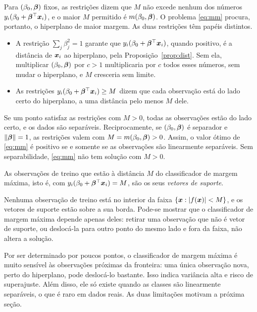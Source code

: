 \documentclass[11pt,a4paper]{article}
\begin{document}
Para $(\beta_0,\bm{\beta})$ fixos, as restrições dizem que $M$ não excede nenhum dos
números $y_i(\beta_0+\bm{\beta}^\top\bm{x}_i)$, e o maior $M$ permitido é
$m(\beta_0,\bm{\beta})$. O problema \eqref{eq:mm} procura, portanto, o hiperplano de maior
margem. As duas restrições têm papéis distintos.
\begin{itemize}[leftmargin=1.4cm]
  \item A restrição $\sum_j\beta_j^2=1$ garante que $y_i(\beta_0+\bm{\beta}^\top\bm{x}_i)$,
        quando positivo, é a distância de $\bm{x}_i$ ao hiperplano, pela
        Proposição~\ref{prop:dist}. Sem ela, multiplicar
        $(\beta_0,\bm{\beta})$ por $c>1$ multiplicaria por $c$ todos esses números, sem
        mudar o hiperplano, e $M$ cresceria sem limite.
  \item As restrições $y_i(\beta_0+\bm{\beta}^\top\bm{x}_i)\ge M$ dizem que cada observação
        está do lado certo do hiperplano, a uma distância pelo menos $M$ dele.
\end{itemize}
Se um ponto satisfaz as restrições com $M>0$, todas as observações estão do lado
certo, e os dados são separáveis. Reciprocamente, se $(\beta_0,\bm{\beta})$ é separador e
$\left\lVert \bm{\beta} \right\rVert=1$, as restrições valem com $M=m(\beta_0,\bm{\beta})>0$. Assim, o valor
ótimo de \eqref{eq:mm} é positivo se e somente se as observações são linearmente
separáveis. Sem separabilidade, \eqref{eq:mm} não tem solução com $M>0$.

\begin{definicao}
As observações de treino que estão à distância $M$ do classificador de margem máxima,
isto é, com $y_i(\beta_0+\bm{\beta}^\top\bm{x}_i)=M$, são os seus \emph{vetores de suporte}.
\end{definicao}

Nenhuma observação de treino está no interior da faixa $\{\bm{x}:\left\lvert f(\bm{x}) \right\rvert<M\}$, e os
vetores de suporte estão sobre a sua borda. Pode-se mostrar que o classificador de
margem máxima depende apenas deles: retirar uma observação que não é vetor de suporte,
ou deslocá-la para outro ponto do mesmo lado e fora da faixa, não altera a solução.

\begin{atencao}
Por ser determinado por poucos pontos, o classificador de margem máxima é muito
sensível às observações próximas da fronteira: uma única observação nova, perto do
hiperplano, pode deslocá-lo bastante. Isso indica variância alta e risco de
superajuste. Além disso, ele só existe quando as classes são linearmente separáveis,
o que é raro em dados reais. As duas limitações motivam a próxima seção.
\end{atencao}
\end{document}
